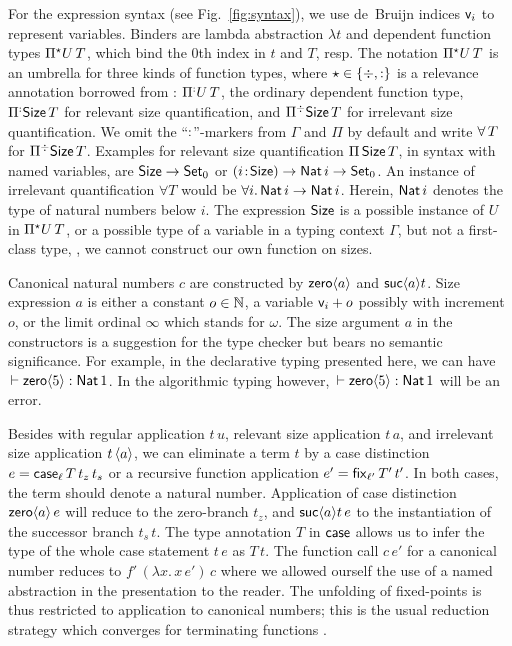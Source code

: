 \documentclass[acmlarge,review,anonymous]{acmart}\settopmatter{printfolios=true}
\begin{document}
For the expression syntax (see Fig.~\ref{fig:syntax}), we use de~Bruijn \citeyearpar{deBruijn:nameless} indices $\ind i$ to represent variables.  Binders are lambda abstraction $\lambda t$ and dependent function types $\epiT U T$, which bind the $0$th index in $t$ and $T$, resp.  The notation $\epiT U T$ is an umbrella for three kinds of function types, where $\evar \in \{ \erased, \noterased \}$ is a relevance annotation borrowed from \citet{pfenning:intextirr}: $\erpiT[\noterased] U T$, the ordinary dependent function type, $\erpiT[\noterased] \Size T$ for relevant size quantification, and $\erpiT \Size T$ for irrelevant size quantification.
We omit the ``$\noterased$''-markers from $\Gamma$ and $\Pi$ by default and write $\forallT T$ for $\erpiT \Size T$.
%
Examples for relevant size quantification $\piT \Size T$, in syntax with named variables, are $\Size \to \Set[0]$ or $\funT i \Size \Nat i \to \Set[0]$.  An instance of irrelevant quantification $\forall T$ would be $\forall i.\, \Nat i \to \Nat i$.  Herein, $\Nat i$ denotes the type of natural numbers below $i$. The expression $\Size$ is a possible instance of $U$ in $\epiT U T$, or a possible type of a variable in a typing context $\Gamma$, but not a first-class type, \ie, we cannot construct our own function on sizes.

Canonical natural numbers $c$ are constructed by $\zero a$ and $\suc a t$.
Size expression $a$ is either a constant $o \in \NN$, a variable
$\ind i + o$ possibly with increment $o$, or the limit ordinal
$\infty$ which stands for $\omega$.  The size argument $a$ in the
constructors is a suggestion for the type checker but bears no
semantic significance.  For example, in the declarative typing
presented here, we can have $\der \zero 5 : \Nat 1$.
In the algorithmic typing however, $\der \zero 5 \jchk \Nat 1$ will be an error.

Besides with regular application $t\,u$, relevant size application $t\,a$, and irrelevant size application $t \, \ann a$,
we can eliminate a term $t$ by a case distinction $e = \case[\ell] T {t_z}{t_s}$ or a recursive function application $e' = \fix[\ell'] {T'} {t'}$.  In both cases, the term should denote a natural number.  Application of case distinction $\zero a \, e$ will reduce to the zero-branch $t_z$, and $\suc a t \,e$ to the instantiation of the successor branch $t_s\,t$.  The type annotation $T$ in $\tcase$ allows us to infer the type of the whole case statement $t\,e$ as $T\,t$.  The function call $c\,e'$ for a canonical number reduces to $f'\,(\lambda x.\,x\,e')\,c$ where we allowed ourself the use of a named abstraction in the presentation to the reader.  The unfolding of fixed-points is thus restricted to application to canonical numbers; this is the usual reduction strategy which converges for terminating functions \cite{gimenez:typeBased}.
\end{document}
